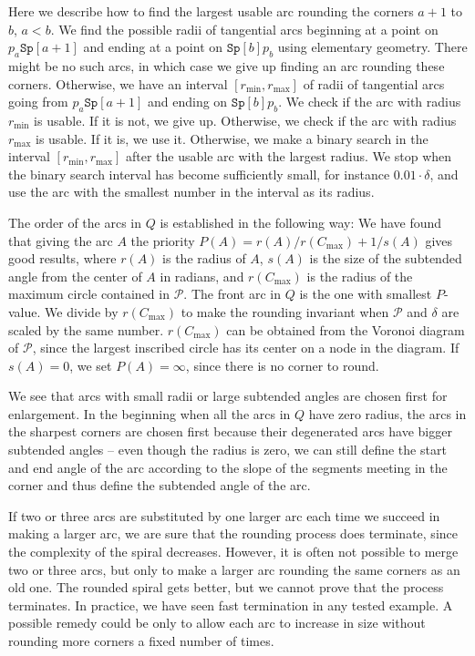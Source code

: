 \documentclass[3p]{elsarticle}
\newcommand{\PP}{\mathcal{P}}
\newcommand{\stepover}{\delta}
\newcommand{\spiral}{\texttt{Sp}}
\begin{document}
Here we describe how to find the largest usable arc rounding the corners
$a+1$ to $b$, $a<b$. We find the possible radii of tangential arcs beginning at
a point on $p_a\spiral[a+1]$ and ending at a point on $\spiral[b]p_b$ using elementary geometry.
There might be no such arcs, in which case we give up
finding an arc rounding these corners.
Otherwise, we have an interval $[r_{\min},r_{\max}]$ of radii of tangential arcs
going from $p_a\spiral[a+1]$ and ending on $\spiral[b]p_b$.
We check if the arc with radius $r_{\min}$ is usable.
If it is not, we give up. Otherwise, we check if
the arc with radius $r_{\max}$ is usable. If it is, we use it. Otherwise, we
make a binary search in the interval $[r_{\min},r_{\max}]$
after the usable arc with the largest radius. We stop when the binary search interval
has become sufficiently small, for instance $0.01\cdot \stepover$, and use the arc
with the smallest number in the interval as its radius.

The order of the arcs in $Q$ is established in the following way:
We have found that giving the arc $A$ the priority
$P(A)=r(A)/r(C_{\max})+1/s(A)$ gives good results, where
$r(A)$ is the radius of $A$, $s(A)$ is the size of the subtended angle from the center of $A$
in radians, and
$r(C_{\max})$ is the radius of the maximum circle contained in $\PP$.
The front arc in $Q$ is the one with smallest $P$-value.
We divide by $r(C_{\max})$ to make the rounding invariant when $\PP$ and $\stepover$ are scaled
by the same number.
$r(C_{\max})$ can be obtained from the Voronoi diagram of $\PP$, since the largest inscribed circle
has its center on a node in the diagram.
If $s(A)=0$, we set $P(A)=\infty$, since there is no corner to round.

We see that arcs with small radii or large subtended angles are chosen first for enlargement.
In the beginning when all the arcs in $Q$ have zero radius, the arcs in the sharpest corners are
chosen first because their degenerated arcs have bigger subtended angles -- even though the radius
is zero, we can still define the start and end angle of the arc according to the slope of the segments
meeting in the corner and thus define the subtended angle of the arc.

If two or three arcs are substituted by one larger arc each time we succeed in making a larger arc,
we are sure that
the rounding process does terminate, since the complexity of the spiral decreases.
However, it is often not possible to merge two or three arcs, but only to make a larger
arc rounding the same corners as an old one. The rounded spiral gets better, but we cannot
prove that the process terminates. In practice, we have seen fast termination in any tested example.
A possible remedy could be only to allow each arc to increase in size without rounding more corners
a fixed number of times.
\end{document}
